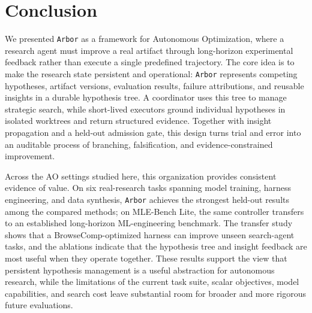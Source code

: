 \documentclass[]{selfevolagent}
\theoremstyle{plain}
\theoremstyle{definition}
\theoremstyle{remark}
\newcommand{\arbor}{\texttt{Arbor}}
\begin{document}
\FloatBarrier

\section{Conclusion}\label{sec:conclusion}

We presented \arbor{} as a framework for Autonomous Optimization, where a
research agent must improve a real artifact through long-horizon experimental
feedback rather than execute a single predefined trajectory. The core idea is
to make the research state persistent and operational: \arbor{} represents
competing hypotheses, artifact versions, evaluation results, failure
attributions, and reusable insights in a durable hypothesis tree. A coordinator
uses this tree to manage strategic search, while short-lived executors ground
individual hypotheses in isolated worktrees and return structured evidence.
Together with insight propagation and a held-out admission gate, this design
turns trial and error into an auditable process of branching, falsification,
and evidence-constrained improvement.

Across the AO settings studied here, this organization provides consistent
evidence of value. On six real-research tasks spanning model training, harness
engineering, and data synthesis, \arbor{} achieves the strongest held-out
results among the compared methods; on MLE-Bench Lite, the same controller
transfers to an established long-horizon ML-engineering benchmark. The transfer
study shows that a BrowseComp-optimized harness can improve unseen search-agent
tasks, and the ablations indicate that the hypothesis tree and insight feedback
are most useful when they operate together. These results support the view that
persistent hypothesis management is a useful abstraction for autonomous
research, while the limitations of the current task suite, scalar objectives,
model capabilities, and search cost leave substantial room for broader and more
rigorous future evaluations.

\FloatBarrier



\appendix

\newpage

\end{document}
